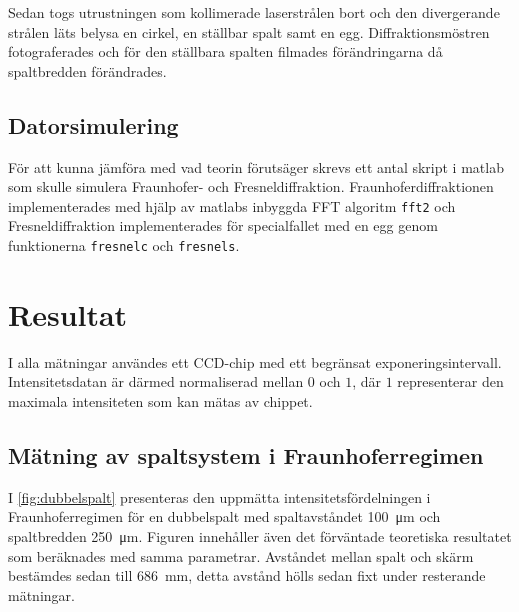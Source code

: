 \documentclass[a4paper]{article}
\begin{document}
  Sedan togs utrustningen som kollimerade laserstrålen bort och den divergerande strålen läts belysa en cirkel, en ställbar spalt samt en egg. Diffraktionsmöstren fotograferades och för den ställbara spalten filmades förändringarna då spaltbredden förändrades.
  
  \subsection{Datorsimulering}
  
  För att kunna jämföra med vad teorin förutsäger skrevs ett antal skript i matlab som skulle simulera Fraunhofer- och Fresneldiffraktion. Fraunhoferdiffraktionen implementerades med hjälp av matlabs inbyggda FFT algoritm \lstinline{fft2} och Fresneldiffraktion implementerades för specialfallet med en egg genom funktionerna  \lstinline{fresnelc} och \lstinline{fresnels}.

\section{Resultat}

I alla mätningar användes ett CCD-chip med ett begränsat exponeringsintervall. Intensitetsdatan är därmed normaliserad mellan $0$ och $1$, där $1$ representerar den maximala intensiteten som kan mätas av chippet.

\subsection{Mätning av spaltsystem i Fraunhoferregimen}

I \autoref{fig:dubbelspalt} presenteras den uppmätta intensitetsfördelningen i Fraunhoferregimen för en dubbelspalt med spaltavståndet \SI{100}{\micro\m} och spaltbredden \SI{250}{\micro\m}. Figuren innehåller även det förväntade teoretiska resultatet som beräknades med samma parametrar. Avståndet mellan spalt och skärm bestämdes sedan till \SI{686}{\milli\m},  detta avstånd hölls sedan fixt under resterande mätningar.

\FloatBarrier
\end{document}
